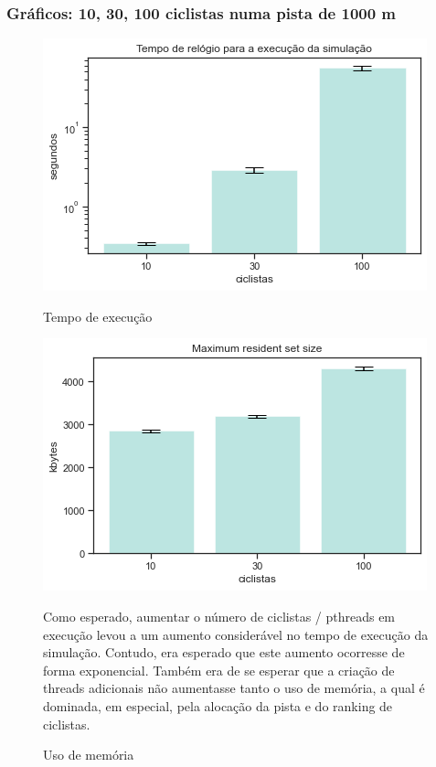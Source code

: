 \documentclass{beamer}
\begin{document}
\begin{frame}
\frametitle{Gráficos: 10, 30, 100 ciclistas numa pista de 1000 m}


\begin{figure}[!htb]
  \includegraphics[width=\linewidth]{imgs/ciclistas_tempo}
  \caption{Tempo de execução}\label{fig:awesome_image1}
\endminipage\hfill
{}
  \includegraphics[width=\linewidth]{imgs/ciclistas_memoria}
  \caption{Uso de memória}\label{fig:awesome_image2}
  \endminipage\hfill

Como esperado, aumentar o número de ciclistas / pthreads em execução levou a um aumento considerável no tempo de
    execução da simulação. Contudo, era esperado que este aumento ocorresse de forma exponencial. Também era de se
    esperar que a criação de threads adicionais não aumentasse tanto o uso de memória, a qual é dominada, em especial,
    pela alocação da pista e do ranking de ciclistas.

\end{figure}

\end{frame}
\end{document}
